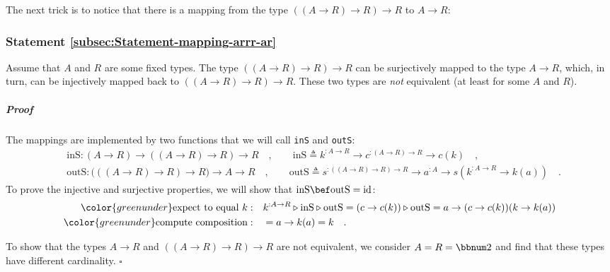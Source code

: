 The next trick is to notice that there is a mapping from the type
$((A\rightarrow R)\rightarrow R)\rightarrow R$ to $A\rightarrow R$:

\subsubsection{Statement \label{subsec:Statement-mapping-arrr-ar}\ref{subsec:Statement-mapping-arrr-ar}}

Assume that $A$ and $R$ are some fixed types. The type $((A\rightarrow R)\rightarrow R)\rightarrow R$
can be surjectively mapped to the type $A\rightarrow R$, which, in
turn, can be injectively mapped back to $((A\rightarrow R)\rightarrow R)\rightarrow R$.
These two types are \emph{not} equivalent (at least for some $A$
and $R$).

\subparagraph{Proof}

The mappings are implemented by two functions that we will call \lstinline!inS!
and \lstinline!outS!:
\begin{align*}
 & \text{inS}:(A\rightarrow R)\rightarrow((A\rightarrow R)\rightarrow R)\rightarrow R\quad,\quad\quad\text{inS}\triangleq k^{:A\rightarrow R}\rightarrow c^{:(A\rightarrow R)\rightarrow R}\rightarrow c(k)\quad,\\
 & \text{outS}:\big(((A\rightarrow R)\rightarrow R)\rightarrow R\big)\rightarrow A\rightarrow R\quad,\quad\quad\text{outS}\triangleq s^{:((A\rightarrow R)\rightarrow R)\rightarrow R}\rightarrow a^{:A}\rightarrow s(k^{:A\rightarrow R}\rightarrow k(a))\quad.
\end{align*}
To prove the injective and surjective properties, we will show that
$\text{inS}\bef\text{outS}=\text{id}$:
\begin{align*}
{\color{greenunder}\text{expect to equal }k:}\quad & k^{:A\rightarrow R}\triangleright\text{inS}\triangleright\text{outS}=(c\rightarrow c(k))\triangleright\text{outS}=a\rightarrow(c\rightarrow c(k))(k\rightarrow k(a))\\
{\color{greenunder}\text{compute composition}:}\quad & =a\rightarrow k(a)=k\quad.
\end{align*}

To show that the types $A\rightarrow R$ and $((A\rightarrow R)\rightarrow R)\rightarrow R$
are not equivalent, we consider $A=R=\bbnum 2$ and find that these
types have different cardinality. $\square$

